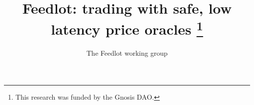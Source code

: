 %
%

\usepackage{titling}

\pretitle{
  \begin{flushleft} \Huge \sffamily \rule{\textwidth}{0.1ex}\vspace{1ex}}
\posttitle{ \rule{\textwidth}{0.1ex} \end{flushleft}}
\title{ Feedlot: trading with safe, low latency price oracles  \thanks{This research was funded by the Gnosis DAO.} }

\preauthor{\begin{flushleft} \LARGE \sffamily \itshape}
\author{The Feedlot working group}
\postauthor{\end{flushleft}}

\date{}


\newcommand \printsplash {%
\noindent
  { \color {gray} \rule[-1ex]{0.5em}{7ex}\hspace{2em} }
  \begin{minipage}[b]{\textwidth - 4.7em}
    \onehalfspacing
    \emph{feed} --- Something supplied continuously.
    
    \emph{lot} --- One or more items auctioned or sold as a unit, separate from other items.
  \end{minipage}
  { \color {gray} \rule[-1ex]{0.2em}{7ex}\hspace{2em} }
  \vspace{4ex}
}